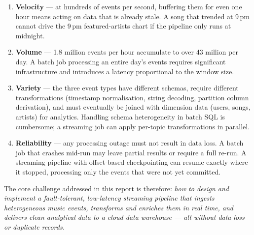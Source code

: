 \begin{enumerate}
  \item \textbf{Velocity} — at hundreds of events per second, buffering them for even one hour
        means acting on data that is already stale.
        A song that trended at 9\,pm cannot drive the 9\,pm featured-artists chart if the pipeline
        only runs at midnight.
  \item \textbf{Volume} — 1.8 million events per hour accumulate to over 43 million per day.
        A batch job processing an entire day's events requires significant infrastructure and
        introduces a latency proportional to the window size.
  \item \textbf{Variety} — the three event types have different schemas, require different
        transformations (timestamp normalisation, string decoding, partition column derivation),
        and must eventually be joined with dimension data (users, songs, artists) for analytics.
        Handling schema heterogeneity in batch SQL is cumbersome; a streaming job can apply
        per-topic transformations in parallel.
  \item \textbf{Reliability} — any processing outage must not result in data loss.
        A batch job that crashes mid-run may leave partial results or require a full re-run.
        A streaming pipeline with offset-based checkpointing can resume exactly where it stopped,
        processing only the events that were not yet committed.
\end{enumerate}

The core challenge addressed in this report is therefore:
\textit{how to design and implement a fault-tolerant, low-latency streaming pipeline that
ingests heterogeneous music events, transforms and enriches them in real time, and delivers
clean analytical data to a cloud data warehouse — all without data loss or duplicate records.}
